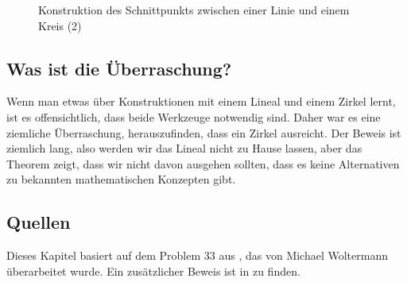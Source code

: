 \begin{figure}[b]
\begin{center}
\end{center}
\caption{Konstruktion des Schnittpunkts zwischen einer Linie und einem Kreis (2)}\label{f.compass-circle5}
\end{figure}

\subsection*{Was ist die Überraschung?}

Wenn man etwas über Konstruktionen mit einem Lineal und einem Zirkel lernt, ist es offensichtlich, dass beide Werkzeuge notwendig sind. Daher war es eine ziemliche Überraschung, herauszufinden, dass ein Zirkel ausreicht. Der Beweis ist ziemlich lang, also werden wir das Lineal nicht zu Hause lassen, aber das Theorem zeigt, dass wir nicht davon ausgehen sollten, dass es keine Alternativen zu bekannten mathematischen Konzepten gibt.

\subsection*{Quellen}

Dieses Kapitel basiert auf dem Problem $33$ aus \cite{dorrie1}, das von Michael Woltermann \cite{dorrie2} überarbeitet wurde. Ein zusätzlicher Beweis ist in \cite{mm} zu finden.
